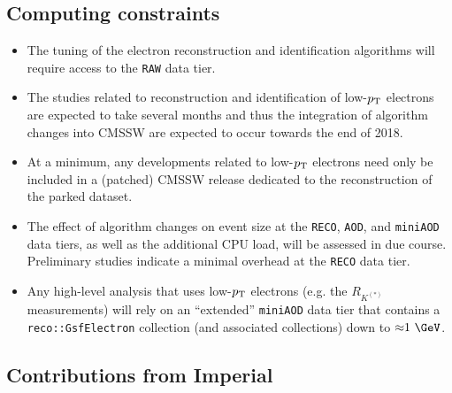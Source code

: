 
\subsection{Computing constraints}

\begin{itemize}
\item The tuning of the electron reconstruction and identification
  algorithms will require access to the \verb!RAW! data tier.
\item The studies related to reconstruction and identification of
  low-$p_\mathrm{T}$ electrons are expected to take several months and thus the
  integration of algorithm changes into CMSSW are expected to occur
  towards the end of 2018.
\item At a minimum, any developments related to low-$p_\mathrm{T}$ electrons
  need only be included in a (patched) CMSSW release dedicated to the
  reconstruction of the parked dataset.
\item The effect of algorithm changes on event size at the
  \verb!RECO!, \verb!AOD!, and \verb!miniAOD! data tiers, as well as
  the additional CPU load, will be assessed in due course. Preliminary
  studies indicate a minimal overhead at the \verb!RECO! data tier.
\item Any high-level analysis that uses low-$p_\mathrm{T}$ electrons (e.g. the
  $R_{K^{(*)}}$ measurements) will rely on an ``extended''
  \verb!miniAOD! data tier that contains a \verb!reco::GsfElectron!
  collection (and associated collections) down to
  ${\approx}1~\GeV$.
\end{itemize}

\subsection{Contributions from Imperial}


